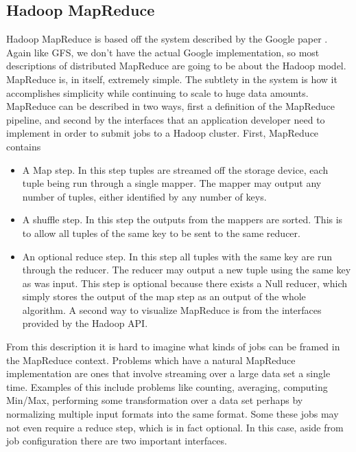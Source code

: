 \documentclass{article}
\begin{document}
\subsection{Hadoop MapReduce}
Hadoop MapReduce is based off the system described by the Google paper \cite{mapreduce}. Again like GFS, we don't have the actual Google implementation, so most descriptions of distributed MapReduce are going to be about the Hadoop model. MapReduce is, in itself, extremely simple. The subtlety in the system is how it accomplishes simplicity while continuing to scale to huge data amounts. MapReduce can be described in two ways, first a definition of the MapReduce pipeline, and second by the interfaces that an application developer need to implement in order to submit jobs to a Hadoop cluster. First, MapReduce contains 

\begin{itemize}

\item A Map step. In this step tuples are streamed off the storage device, each tuple being run through a single mapper. The mapper may output any number of tuples, either identified by any number of keys. 

\item A shuffle step. In this step the outputs from the mappers are sorted. This is to allow all tuples of the same key to be sent to the same reducer. 

\item An optional reduce step. In this step all tuples with the same key are run through the reducer. The reducer may output a new tuple using the same key as was input. This step is optional because there exists a Null reducer, which simply stores the output of the map step as an output of the whole algorithm. A second way to visualize MapReduce is from the interfaces provided by the Hadoop API. 

\end{itemize}
From this description it is hard to imagine what kinds of jobs can be framed in the MapReduce context. Problems which have a natural MapReduce implementation are ones that involve streaming over a large data set a single time. Examples of this include problems like counting, averaging, computing Min/Max, performing some transformation over a data set perhaps by normalizing multiple input formats into the same format. Some these jobs may not even require a reduce step, which is in fact optional. In this case, aside from job configuration there are two important interfaces. 
\end{document}
